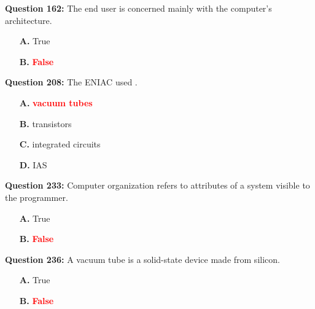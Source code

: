 \documentclass[12pt,a4paper]{article}
\begin{document}
\vspace{0.5cm}

\vspace{0.5cm}

\textbf{Question 162:} The end user is concerned mainly with the computer's architecture.

\begin{itemize}
    \item[\textbf{A.}] True
    \item[\textbf{B.}] \textcolor{red}{\textbf{False}}
\end{itemize}

\vspace{0.5cm}

\vspace{0.5cm}

\textbf{Question 208:} The ENIAC used \underline{\hspace{1.5cm}}.

\begin{itemize}
    \item[\textbf{A.}] \textcolor{red}{\textbf{vacuum tubes}}
    \item[\textbf{B.}] transistors
    \item[\textbf{C.}] integrated circuits
    \item[\textbf{D.}] IAS
\end{itemize}

\vspace{0.5cm}

\vspace{0.5cm}

\textbf{Question 233:} Computer organization refers to attributes of a system visible to the programmer.

\begin{itemize}
    \item[\textbf{A.}] True
    \item[\textbf{B.}] \textcolor{red}{\textbf{False}}
\end{itemize}

\vspace{0.5cm}

\vspace{0.5cm}

\textbf{Question 236:} A vacuum tube is a solid-state device made from silicon.

\begin{itemize}
    \item[\textbf{A.}] True
    \item[\textbf{B.}] \textcolor{red}{\textbf{False}}
\end{itemize}
\end{document}
